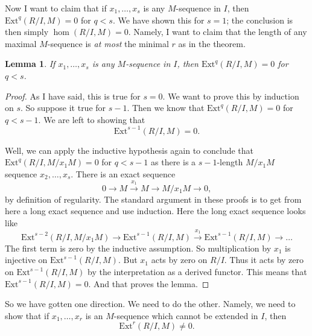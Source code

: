 \documentclass{article}
\newtheorem{lemma}{Lemma}
\begin{document}
Now I want to claim that if $x_1, \dots, x_s$ is any $M$-sequence in $I$, then
$\mathrm{Ext}^q( R/I, M) = 0$ for $q < s$. We have shown this for $s=1$; the conclusion
is then simply $\hom(R/I, M)=0$. Namely, I want to claim that the length of any
maximal $M$-sequence is \emph{at most} the minimal $r$ as in the theorem.
\begin{lemma} 
If $x_1, \dots, x_s$ is any $M$-sequence in $I$, then
$\mathrm{Ext}^q( R/I, M) = 0$ for $q < s$.
\end{lemma} 
\begin{proof} 
As I have said, this is true for $s=0$. We want to prove this by induction on
$s$. So suppose it true for $s-1$. Then we know that $\mathrm{Ext}^q(R/I, M)=0$ for $q
< s-1$. We are left to showing that
\[ \mathrm{Ext}^{s-1} (R/I, M) = 0. \]

Well, we can apply the inductive hypothesis again to conclude that $\mathrm{Ext}^q(R/I,
M/x_1 M) = 0$ for $q < s-1$ as there is a $s-1$-length $M/x_1 M$ sequence $x_2,
\dots, x_s$.
There is an exact sequence
\[ 0 \to M \stackrel{x_1}{\to} M \to M/x_1 M \to 0,  \]
by definition of regularity. The standard argument in these proofs is to get
from here a long exact sequence and use induction. Here the long exact sequence
looks like
\[  \mathrm{Ext}^{s-2}(R/I, M/x_1 M)  \to \mathrm{Ext}^{s-1}(R/I, M) \stackrel{x_1}{\to}
\mathrm{Ext}^{s-1}(R/I, M) \to \dots  \]
The first term is zero by the inductive assumption. So multiplication by $x_1$
is injective on $\mathrm{Ext}^{s-1}(R/I, M)$. But $x_1$ acts by zero on $R/I$. Thus it
acts by zero on $\mathrm{Ext}^{s-1}(R/I, M)$ by the interpretation as a derived
functor. This means that $\mathrm{Ext}^{s-1}(R/I, M) =0$. And that proves the lemma. 
\end{proof} 


So we have gotten one direction. We need to do the other. Namely, we need to
show that if $x_1, \dots, x_r$ is an $M$-sequence which cannot be extended in
$I$, then 
\[ \mathrm{Ext}^r(R/I, M) \neq 0.  \]
\end{document}
